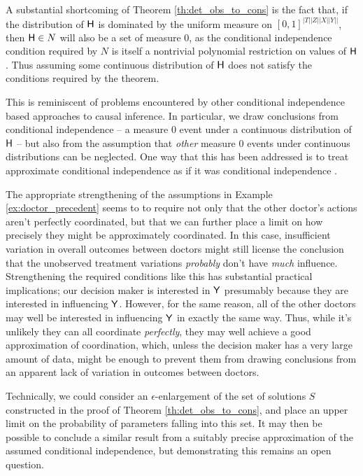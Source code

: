 A substantial shortcoming of Theorem \ref{th:det_obs_to_cons} is the fact that, if the distribution of $\mathsf{H}$ is dominated by the uniform measure on $[0,1]^{|T||Z||X||Y||}$, then $\mathsf{H}\in N$ will also be a set of measure 0, as the conditional independence condition required by $N$ is itself a nontrivial polynomial restriction on values of $\mathsf{H}$. Thus assuming some continuous distribution of $\mathsf{H}$ does not satisfy the conditions required by the theorem.

This is reminiscent of problems encountered by other conditional independence based approaches to causal inference. In particular, we draw conclusions from conditional independence -- a measure 0 event under a continuous distribution of $\mathsf{H}$ -- but also from the assumption that \emph{other} measure 0 events under continuous distributions can be neglected. One way that this has been addressed is to treat approximate conditional independence as if it was conditional independence \citep{zhang_strong_2003}.

The appropriate strengthening of the assumptions in Example \ref{ex:doctor_precedent} seems to to require not only that the other doctor's actions aren't perfectly coordinated, but that we can further place a limit on how precisely they might be approximately coordinated. In this case, insufficient variation in overall outcomes between doctors might still license the conclusion that the unobserved treatment variations \emph{probably} don't have \emph{much} influence. Strengthening the required conditions like this has substantial practical implications; our decision maker is interested in $\mathsf{Y}$ presumably because they are interested in influencing $\mathsf{Y}$. However, for the same reason, all of the other doctors may well be interested in influencing $\mathsf{Y}$ in exactly the same way. Thus, while it's unlikely they can all coordinate \emph{perfectly}, they may well achieve a good approximation of coordination, which, unless the decision maker has a very large amount of data, might be enough to prevent them from drawing conclusions from an apparent lack of variation in outcomes between doctors.

Technically, we could consider an $\epsilon$-enlargement of the set of solutions $S$ constructed in the proof of Theorem \ref{th:det_obs_to_cons}, and place an upper limit on the probability of parameters falling into this set. It may then be possible to conclude a similar result from a suitably precise approximation of the assumed conditional independence, but demonstrating this remains an open question.

